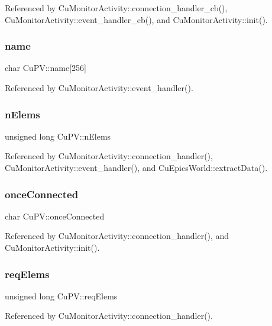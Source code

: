 Referenced by Cu\+Monitor\+Activity\+::connection\+\_\+handler\+\_\+cb(), Cu\+Monitor\+Activity\+::event\+\_\+handler\+\_\+cb(), and Cu\+Monitor\+Activity\+::init().

\mbox{\label{structCuPV_a5b4a94b9875c2f467391f3724c5dbb56}} 
\subsubsection{name}
{\footnotesize\ttfamily char Cu\+P\+V\+::name[256]}



Referenced by Cu\+Monitor\+Activity\+::event\+\_\+handler().

\mbox{\label{structCuPV_aebb9cceb11972728961d7e6a1fc34e18}} 
\subsubsection{n\+Elems}
{\footnotesize\ttfamily unsigned long Cu\+P\+V\+::n\+Elems}



Referenced by Cu\+Monitor\+Activity\+::connection\+\_\+handler(), Cu\+Monitor\+Activity\+::event\+\_\+handler(), and Cu\+Epics\+World\+::extract\+Data().

\mbox{\label{structCuPV_a4a80a458b21ec2fcbdaa3bb2172593bc}} 
\subsubsection{once\+Connected}
{\footnotesize\ttfamily char Cu\+P\+V\+::once\+Connected}



Referenced by Cu\+Monitor\+Activity\+::connection\+\_\+handler(), and Cu\+Monitor\+Activity\+::init().

\mbox{\label{structCuPV_ad339a8ea01e2f53eb6951a5481ce7868}} 
\subsubsection{req\+Elems}
{\footnotesize\ttfamily unsigned long Cu\+P\+V\+::req\+Elems}



Referenced by Cu\+Monitor\+Activity\+::connection\+\_\+handler().

